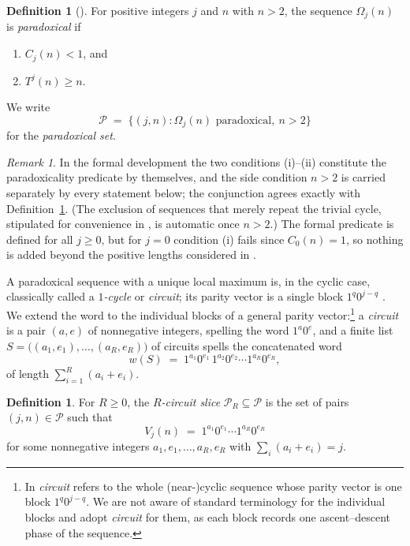 \documentclass[11pt]{amsart}
\theoremstyle{plain}
\theoremstyle{definition}
\newtheorem{definition}[theorem]{Definition}
\theoremstyle{remark}
\newtheorem{remark}[theorem]{Remark}
\newcommand{\Par}{\mathcal{P}}        %
\newcommand{\ParR}[1]{\Par_{#1}}      %
\begin{document}
\begin{definition}[{\cite[Def.~1.1]{Roz25}}]\label{def:paradoxical}
For positive integers $j$ and $n$ with $n>2$, the sequence $\Omega_j(n)$ is
\emph{paradoxical} if
\begin{enumerate}
\item[(i)] $C_j(n)<1$, and
\item[(ii)] $T^j(n)\ge n$.
\end{enumerate}
We write
\[
\Par \;=\; \bigl\{(j,n) : \Omega_j(n) \text{ paradoxical},\ n>2\bigr\}
\]
for the \emph{paradoxical set}.
\end{definition}

\begin{remark}\label{rem:predicate}
In the formal development the two conditions (i)--(ii) constitute the
paradoxicality predicate by themselves, and the side condition $n>2$ is
carried separately by every statement below; the conjunction agrees exactly
with Definition~\ref{def:paradoxical}.  (The exclusion of sequences that
merely repeat the trivial cycle, stipulated for convenience in
\cite[Def.~1.1]{Roz25}, is automatic once $n>2$.)  The formal predicate is
defined for all $j\ge 0$, but for $j=0$ condition (i) fails since
$C_0(n)=1$, so nothing is added beyond the positive lengths considered
in \cite{Roz25}.
\end{remark}

A paradoxical sequence with a unique local maximum is, in the cyclic case,
classically called a \emph{$1$-cycle} or \emph{circuit}; its parity vector is
a single block $1^{q}0^{j-q}$ \cite[App.~A]{Roz25}.  We extend the word to
the individual blocks of a general parity vector:\footnote{In
\cite[App.~A]{Roz25} \emph{circuit} refers to the whole (near-)cyclic
sequence whose parity vector is one block $1^{q}0^{j-q}$.  We are not aware
of standard terminology for the individual blocks and adopt \emph{circuit}
for them, as each block records one ascent--descent phase of the sequence.}
a \emph{circuit} is a pair $(a,e)$ of nonnegative integers, spelling the word
$1^{a}0^{e}$, and a finite list $S=\bigl((a_1,e_1),\dots,(a_R,e_R)\bigr)$ of
circuits spells the concatenated word
\[
w(S) \;=\; 1^{a_1}0^{e_1}\,1^{a_2}0^{e_2}\cdots 1^{a_R}0^{e_R},
\]
of length $\sum_{i=1}^{R}(a_i+e_i)$.

\begin{definition}\label{def:slice}
For $R\ge 0$, the \emph{$R$-circuit slice} $\ParR{R}\subseteq\Par$ is the set
of pairs $(j,n)\in\Par$ such that
\[
V_j(n) \;=\; 1^{a_1}0^{e_1}\cdots 1^{a_R}0^{e_R}
\]
for some nonnegative integers $a_1,e_1,\dots,a_R,e_R$ with
$\sum_{i}(a_i+e_i)=j$.
\end{definition}
\end{document}

